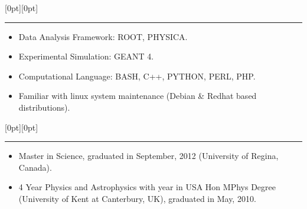 \documentclass[letterpaper,12pt]{letter}
\begin{document}
\raisebox{0pt}[0pt][0pt]{\Large\textbf{\raisebox{-3.5ex}{Computing Skill}}}
\\[2mm]
\rule[-0.5cm]{10cm}{1pt}

% 

\begin{itemize}
\item \textrm{\normalsize Data Analysis Framework: ROOT, PHYSICA.}
\item \textrm{\normalsize Experimental Simulation: GEANT 4.}
\item \textrm{\normalsize Computational Language: BASH, C++, PYTHON, PERL, PHP.}
\item \textrm{\normalsize Familiar with linux system maintenance (Debian \& Redhat based distributions).}
\end{itemize}

\secb


\pagebreak

\raisebox{0pt}[0pt][0pt]{\Large\textbf{\raisebox{-3.5ex}{Qualification}}} 
\\[2mm]
\rule[-0.5cm]{10cm}{1pt}
\begin{itemize}
\item \textrm{\normalsize Master in Science, graduated in September, 2012 (University of Regina, Canada).}
\item \textrm{\normalsize 4 Year Physics and Astrophysics with year in USA Hon MPhys Degree (University of Kent at Canterbury, UK), graduated in May, 2010.}
\end{itemize}
\end{document}
